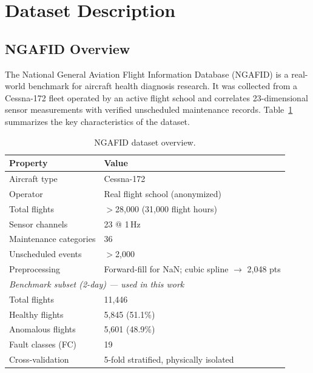 \section{Dataset Description}
\label{sec:dataset}

\subsection{NGAFID Overview}

The National General Aviation Flight Information Database (NGAFID) is a
real-world benchmark for aircraft health diagnosis research. It was collected
from a Cessna-172 fleet operated by an active flight school and correlates
23-dimensional sensor measurements with verified unscheduled maintenance records.
Table~\ref{tab:ngafid_overview} summarizes the key characteristics of the
dataset.

\begin{table}[H]
    \centering
    \caption{NGAFID dataset overview.}
    \label{tab:ngafid_overview}
    \begin{tabular}{ll}
        \toprule
        \textbf{Property} & \textbf{Value} \\
        \midrule
        Aircraft type         & Cessna-172 \\
        Operator              & Real flight school (anonymized) \\
        Total flights         & $>$28{,}000 (31{,}000 flight hours) \\
        Sensor channels       & 23 @ 1\,Hz \\
        Maintenance categories & 36 \\
        Unscheduled events    & $>$2{,}000 \\
        Preprocessing         & Forward-fill for NaN; cubic spline $\to$ 2{,}048 pts \\
        \midrule
        \multicolumn{2}{l}{\textit{Benchmark subset (2-day) — used in this work}} \\
        Total flights         & 11{,}446 \\
        Healthy flights       & 5{,}845 (51.1\%) \\
        Anomalous flights     & 5{,}601 (48.9\%) \\
        Fault classes (FC)    & 19 \\
        Cross-validation      & 5-fold stratified, physically isolated \\
        \bottomrule
    \end{tabular}
\end{table}


